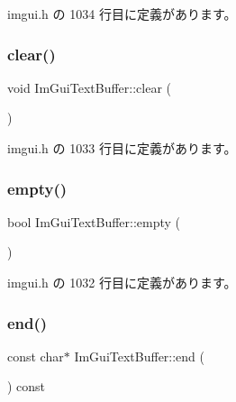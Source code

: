  imgui.\+h の 1034 行目に定義があります。

\mbox{\label{struct_im_gui_text_buffer_a9e4edc9f950bc9e35d5c3b3071dbc0df}} 
\subsubsection{\texorpdfstring{clear()}{clear()}}
{\footnotesize\ttfamily void Im\+Gui\+Text\+Buffer\+::clear (\begin{DoxyParamCaption}{ }\end{DoxyParamCaption})\hspace{0.3cm}{\ttfamily [inline]}}



 imgui.\+h の 1033 行目に定義があります。

\mbox{\label{struct_im_gui_text_buffer_afdef38ae725bb5495f0143170fa902c8}} 
\subsubsection{\texorpdfstring{empty()}{empty()}}
{\footnotesize\ttfamily bool Im\+Gui\+Text\+Buffer\+::empty (\begin{DoxyParamCaption}{ }\end{DoxyParamCaption})\hspace{0.3cm}{\ttfamily [inline]}}



 imgui.\+h の 1032 行目に定義があります。

\mbox{\label{struct_im_gui_text_buffer_a2fc30ad0d384f98dfcea722f798d91f2}} 
\subsubsection{\texorpdfstring{end()}{end()}}
{\footnotesize\ttfamily const char$\ast$ Im\+Gui\+Text\+Buffer\+::end (\begin{DoxyParamCaption}{ }\end{DoxyParamCaption}) const\hspace{0.3cm}{\ttfamily [inline]}}



